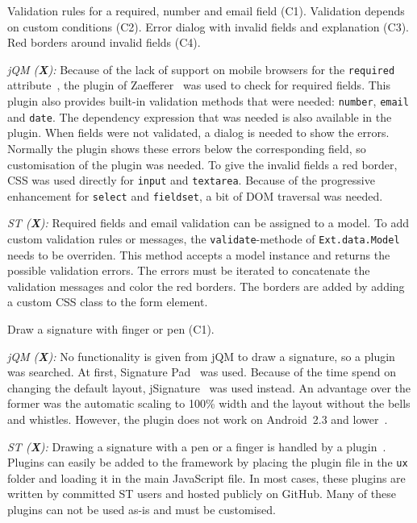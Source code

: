 \documentclass[a4paper]{artikel3}
\newcommand{\code}[1]{\texttt{#1}}
\renewcommand{\paragraph}[1]{\vspace{2mm} \noindent {\bf #1}  }
\newcommand{\framework}[2]{ \emph{#1 (\textbf{#2}): }} %
\newcommand{\challenge}[1]{\paragraph{#1}}
\begin{document}
\challenge{Form validation (C1,C2,C3,C4)}
Validation rules for a required, number and email field (C1).
Validation depends on custom conditions (C2).
Error dialog with invalid fields and explanation (C3).
Red borders around invalid fields (C4).

\framework{jQM}{X}
Because of the lack of support on mobile browsers for the \code{required} attribute~\cite{Deveria2013}, the plugin of Zaefferer~\cite{Zaefferer2013} was used to check for required fields.
This plugin also provides built-in validation methods that were needed: \code{number}, \code{email} and \code{date}.
The dependency expression that was needed is also available in the plugin.
When fields were not validated, a dialog is needed to show the errors.
Normally the plugin shows these errors below the corresponding field, so customisation of the plugin was needed.
To give the invalid fields a red border, CSS was used directly for \code{input} and \code{textarea}.
Because of the progressive enhancement for \code{select} and \code{fieldset}, a bit of DOM traversal was needed.

\framework{ST}{X}
Required fields and email validation can be assigned to a model.  To add custom validation rules or messages,  the \code{validate}-methode of \code{Ext.data.Model} needs to be overriden.  This method accepts a model instance and returns the possible validation errors.  The errors must be iterated to concatenate the validation messages and color the red borders.  The borders are added by adding a custom CSS class to the form element.

\challenge{Signature (C1)}
Draw a signature with finger or pen (C1).

\framework{jQM}{X}
No functionality is given from jQM to draw a signature, so a plugin was searched.
At first, Signature Pad~\cite{Bradley2013} was used.
Because of the time spend on changing the default layout, jSignature~\cite{Systems2013} was used instead.
An advantage over the former was the automatic scaling to 100\% width and the layout without the bells and whistles.
However, the plugin does not work on Android~2.3 and lower~\cite{Systems2013}.

\framework{ST}{X}
Drawing a signature with a pen or a finger is handled by a plugin~\cite{SimFla2011}.  Plugins can easily be added to the framework by placing the plugin file in the \code{ux} folder and loading it in the main JavaScript file.  In most cases,  these plugins are written by committed ST users and hosted publicly on GitHub. Many of these plugins can not be used as-is and must be customised.
\end{document}
